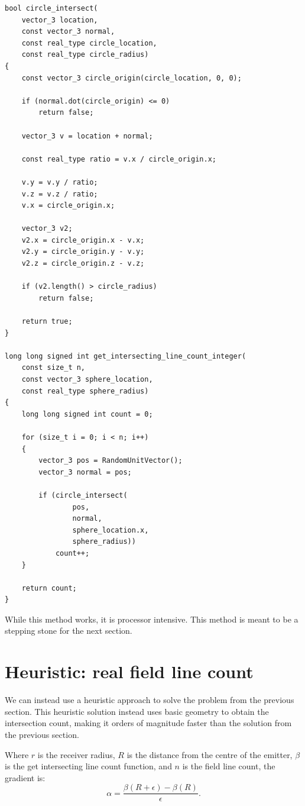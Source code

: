 \documentclass[12pt]{article}
\begin{document}
\begin{lstlisting}
bool circle_intersect(
	vector_3 location, 
	const vector_3 normal, 
	const real_type circle_location, 
	const real_type circle_radius)
{
	const vector_3 circle_origin(circle_location, 0, 0);

	if (normal.dot(circle_origin) <= 0)
		return false;

	vector_3 v = location + normal;

	const real_type ratio = v.x / circle_origin.x;

	v.y = v.y / ratio;
	v.z = v.z / ratio;
	v.x = circle_origin.x;

	vector_3 v2;
	v2.x = circle_origin.x - v.x;
	v2.y = circle_origin.y - v.y;
	v2.z = circle_origin.z - v.z;

	if (v2.length() > circle_radius)
		return false;

	return true;
}

long long signed int get_intersecting_line_count_integer(
	const size_t n,
	const vector_3 sphere_location,
	const real_type sphere_radius)
{
	long long signed int count = 0;

	for (size_t i = 0; i < n; i++)
	{
		vector_3 pos = RandomUnitVector();
		vector_3 normal = pos;

		if (circle_intersect(
				pos, 
				normal, 
				sphere_location.x, 
				sphere_radius))
			count++;
	}

	return count;
}
\end{lstlisting}

While this method works, it is processor intensive.
This method is meant to be a stepping stone for the next section.







\section{Heuristic: real field line count}

We can instead use a heuristic approach to solve the problem from the previous section.
This heuristic solution instead uses basic geometry to obtain the intersection count, making it orders of magnitude faster than the solution from the previous section.

Where $r$ is the receiver radius, $R$ is the distance from the centre of the emitter, $\beta$ is the get intersecting line count function, and $n$ is the field line count, the gradient is:
\begin{equation}
\alpha = \frac{\beta(R + \epsilon) - \beta(R)}{\epsilon}.
\end{equation}
\end{document}
